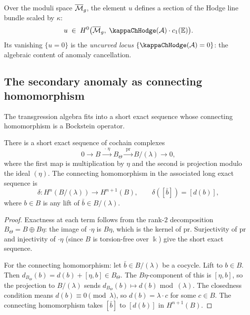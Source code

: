 \begin{remark}
Over the moduli space $\overline{\mathcal{M}}_g$, the element $u$ defines a
section of the Hodge line bundle scaled by $\kappa$:
\[
u \;\in\; H^0\bigl(\overline{\cM}_g,\;
\kappaChHodge(\cA) \cdot c_1(\mathbb{E})\bigr).
\]
Its vanishing $\{u = 0\}$ is the
\emph{uncurved locus} $\{\kappaChHodge(\cA) = 0\}$: the algebraic
content of anomaly cancellation.
\end{remark}

%
%

\subsection{The secondary anomaly as connecting homomorphism}

The transgression algebra fits into a short exact sequence whose
connecting homomorphism is a Bockstein operator.

\begin{proposition}
There is a short exact sequence of cochain complexes
\begin{equation}%
0 \longrightarrow
B \xrightarrow{\;\cdot\,\eta\;}
B_\Theta
\xrightarrow{\;\mathrm{pr}\;}
B / (\lambda)
\longrightarrow 0,
\end{equation}
where the first map is multiplication by $\eta$ and the second is
projection modulo the ideal $(\eta)$. The connecting homomorphism
in the associated long exact sequence is
\begin{equation}%
\delta\colon H^n(B/(\lambda)) \longrightarrow H^{n+1}(B),
\qquad
\delta([\bar{b}]) = [d(b)],
\end{equation}
where $b \in B$ is any lift of $\bar{b} \in B/(\lambda)$.
\end{proposition}

\begin{proof}
Exactness at each term follows from the rank-$2$ decomposition
$B_\Theta = B \oplus B\eta$: the image of $\cdot\eta$ is $B\eta$,
which is the kernel of $\mathrm{pr}$. Surjectivity of $\mathrm{pr}$
and injectivity of $\cdot\eta$ (since $B$ is torsion-free over
$\Bbbk$) give the short exact sequence.

For the connecting homomorphism: let $\bar{b} \in B/(\lambda)$ be a
cocycle. Lift to $b \in B$. Then
$d_{B_\Theta}(b) = d(b) + [\eta, b] \in B_\Theta$. The
$B\eta$-component of this is $[\eta, b]$, so the projection to
$B/(\lambda)$ sends $d_{B_\Theta}(b) \mapsto d(b)$ mod~$(\lambda)$.
The closedness condition means $d(b) \equiv 0 \pmod{\lambda}$, so
$d(b) = \lambda \cdot c$ for some $c \in B$. The connecting
homomorphism takes $[\bar{b}]$ to $[d(b)]$ in $H^{n+1}(B)$.
\end{proof}

